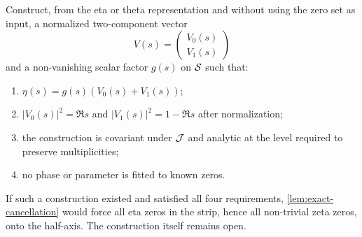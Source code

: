 \begin{problem}
Construct, from the eta or theta representation and without using the zero set as input, a normalized two-component vector
\[
 V(s)=\begin{pmatrix}V_0(s)\\V_1(s)\end{pmatrix}
\]
and a non-vanishing scalar factor $g(s)$ on $\mathcal{S}$ such that:
\begin{enumerate}
  \item $\eta(s)=g(s)(V_0(s)+V_1(s))$;
  \item $|V_0(s)|^2=\Re s$ and $|V_1(s)|^2=1-\Re s$ after normalization;
  \item the construction is covariant under $\mathcal{J}$ and analytic at the level required to preserve multiplicities;
  \item no phase or parameter is fitted to known zeros.
\end{enumerate}
\end{problem}
If such a construction existed and satisfied all four requirements, \cref{lem:exact-cancellation} would force all eta zeros in the strip, hence all non-trivial zeta zeros, onto the half-axis. The construction itself remains open.


